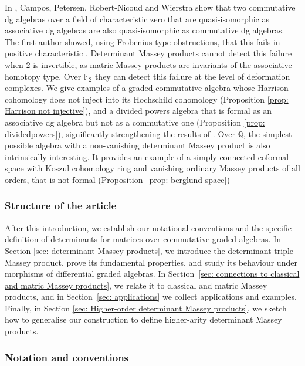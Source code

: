 \documentclass[11pt]{article}
\theoremstyle{definition}
\theoremstyle{definition}
\begin{document}
\smallskip

In \cite{campos24}, Campos, Petersen, Robert-Nicoud and Wierstra show 
that two commutative dg algebras over a field of characteristic zero that 
are quasi-isomorphic as associative dg algebras are also quasi-isomorphic as commutative dg algebras. 
The first author showed, using Frobenius-type obstructions, that this fails in positive characteristic \cite{Oisin--ObstructionTheory}. 
Determinant Massey products cannot detect this failure when $2$ is invertible, 
as matric Massey products are invariants of the associative homotopy type. 
Over $\mathbb F_2$ they can detect this failure at the level of deformation complexes. We give examples of a graded commutative algebra whose Harrison cohomology does not 
inject into its Hochschild cohomology (Proposition \ref{prop: Harrison not injective}),
and a divided powers algebra that is formal as an associative dg algebra but not as a commutative one (Proposition \ref{prop: dividedpowers}), significantly strengthening the results of \cite{Oisin--ObstructionTheory}.
Over $\mathbb Q$, the simplest possible algebra with a non-vanishing determinant Massey product is also intrinsically interesting. 
It provides an example of a simply-connected coformal space with Koszul cohomology ring 
and vanishing ordinary Massey products of all orders, that is not formal (Proposition~\ref{prop: berglund space})

\smallskip 

\subsubsection*{Structure of the article}

After this introduction, we establish our notational conventions and the specific definition of determinants
for matrices over commutative graded algebras.
In Section \ref{sec: determinant Massey products},
we introduce the determinant triple Massey product, prove its fundamental properties, 
and study its behaviour under morphisms of differential graded algebras. 
In Section~\ref{sec: connections to classical and matric Massey products}, 
we relate it to classical and matric Massey products, 
and in Section~\ref{sec: applications} we collect applications and examples.
Finally, in Section \ref{sec: Higher-order determinant Massey products},
we sketch how to generalise our construction to define higher-arity determinant Massey products.




\subsubsection*{Notation and conventions}
\end{document}
